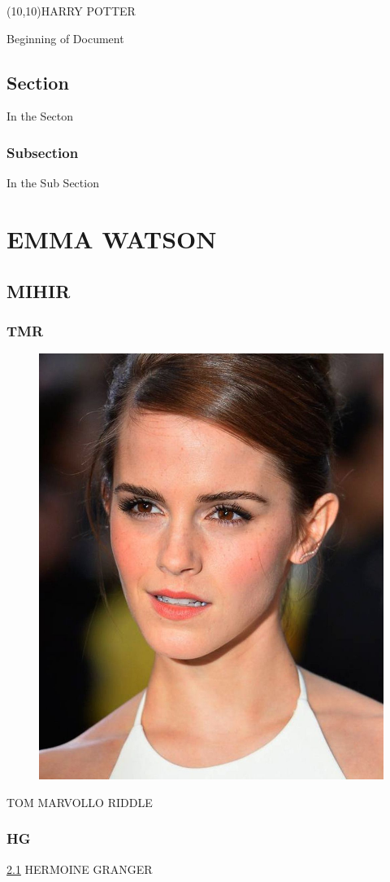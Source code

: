 \documentclass{report}
\begin{document}
	\begin{titlepage}
		\framebox(10,10){HARRY POTTER}
	\end{titlepage}
	\pagebreak
	\tableofcontents
	\pagebreak
	Beginning of Document
	\section{Section}
	In the Secton
	\subsection{Subsection}
	In the Sub Section
	\pagebreak
	\chapter{EMMA WATSON}
	\section{MIHIR}
	\subsection{TMR}
	\begin{figure}
		\includegraphics[scale=0.1]{em}
		\label{fig:EM}
	\end{figure}
	TOM MARVOLLO RIDDLE
	\subsection{HG}
	\ref{fig:EM} HERMOINE GRANGER
\end{document}
